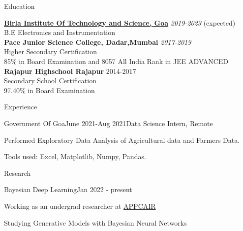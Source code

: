 \documentclass{resume} %
\begin{document}

\begin{rSection}{Education}

{\bf \href{https://www.bits-pilani.ac.in/goa/}{Birla Institute Of Technology and Science, Goa}} \hfill {\em 2019-2023} (expected) \\ 
B.E Electronics and Instrumentation\\


{\bf {Pace Junior Science College, Dadar,Mumbai}} \hfill {\em 2017-2019}\\
Higher Secondary Certification\\
85\% in Board Examination and 8057 All India Rank in JEE ADVANCED \\

{\bf Rajapur Highschool Rajapur} \hfill  {2014-2017} \\ 
Secondary School Certification \\ 
97.40\% in Board Examination 

\end{rSection}

\begin{rSection}{Experience}

\begin{rSubsection}{Government Of Goa}{June 2021-Aug 2021}{Data Science Intern, Remote}{}
    
\item Performed Exploratory Data Analysis of Agricultural data and Farmers Data.
\item Tools used: Excel, Matplotlib, Numpy, Pandas.
\end{rSubsection}
\end{rSection}

\begin{rSection}{Research}

\begin{rSubsection}{Bayesian Deep Learning}{Jan 2022 - present}{}{}

\item Working as an undergrad researcher at \href{https://www.bits-pilani.ac.in/appcair/}{APPCAIR}
\item Studying Generative Models with Bayesian Neural Networks
\end{rSubsection}
\end{rSection}
\end{document}
